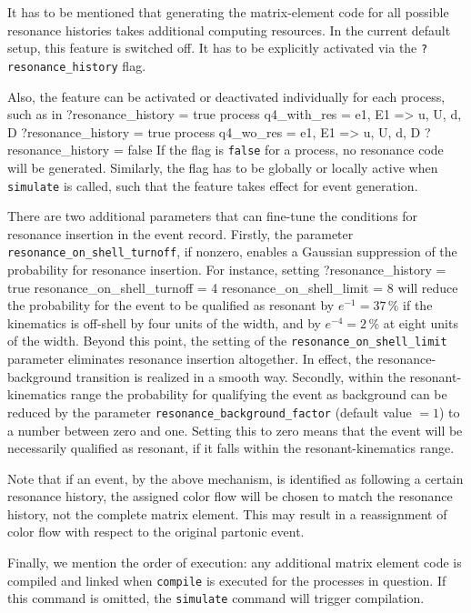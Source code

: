 \documentclass[12pt]{book}
\newenvironment{Code}%
  {\begingroup\footnotesize
   \quote
   \Verbatim[frame=single]}%
  {\endVerbatim
   \endquote
   \endgroup\noindent}
\begin{document}
It has to be mentioned that generating the matrix-element code for all
possible resonance histories takes additional computing resources.  In the
current default setup, this feature is switched off.  It has to be explicitly
activated via the \verb|?resonance_history| flag.

Also, the feature can be activated or deactivated individually for
each process, such as in
\begin{Code}
  ?resonance_history = true
  process q4_with_res = e1, E1 => u, U, d, D  { ?resonance_history = true }
  process q4_wo_res   = e1, E1 => u, U, d, D  { ?resonance_history = false }
\end{Code}
If the flag is \verb|false| for a process, no resonance code will be
generated.  Similarly, the flag has to be globally or locally active
when \verb|simulate| is called, such that the feature takes effect for
event generation.

There are two additional parameters that can fine-tune the conditions for
resonance insertion in the event record.  Firstly, the parameter
\verb|resonance_on_shell_turnoff|, if nonzero, enables a Gaussian suppression
of the probability for resonance insertion.  For instance, setting
\begin{Code}
  ?resonance_history = true
  resonance_on_shell_turnoff = 4
  resonance_on_shell_limit = 8
\end{Code}
will reduce the probability for the event to be qualified as resonant by
$e^{-1}= 37\,\%$ if the kinematics is off-shell by four units of the width,
and by $e^{-4}=2\,\%$ at eight units of the width.  Beyond this point, the
setting of the \verb|resonance_on_shell_limit| parameter eliminates resonance
insertion altogether.  In effect, the resonance-background transition is
realized in a smooth way.  Secondly, within the resonant-kinematics range the
probability for qualifying the event as background can be reduced by the
parameter \verb|resonance_background_factor| (default value $=1$) to a number
between zero and one.  Setting this to zero means that the event will be
necessarily qualified as resonant, if it falls within the resonant-kinematics
range.

Note that if an event, by the above mechanism, is identified as following a
certain resonance history, the assigned color flow will be chosen to match the
resonance history, not the complete matrix element.  This may result in a
reassignment of color flow with respect to the original partonic event.

Finally, we mention the order of execution: any additional
matrix element code is compiled and linked when \verb|compile| is
executed for the processes in question.  If this command is omitted,
the \verb|simulate| command will trigger compilation.
\end{document}
